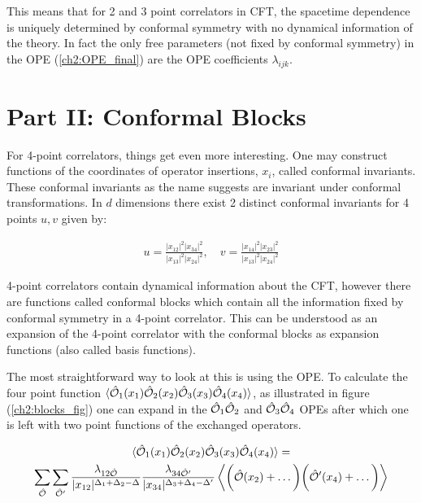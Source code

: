   This means that for 2 and 3 point correlators in CFT, the spacetime dependence is uniquely determined by conformal symmetry with no dynamical information of the theory. In fact the only free parameters (not fixed by conformal symmetry) in the OPE (\ref{ch2:OPE_final}) are the OPE coefficients $\lambda_{ijk}$.
  

  \section{Part II: Conformal Blocks}
  
    For 4-point correlators, things get even more interesting. One may construct functions of the coordinates of operator insertions, $x_i$, called conformal invariants. These conformal invariants as the name suggests are invariant under conformal transformations. In $d$ dimensions there exist 2 distinct conformal invariants for 4 points $u,v$ given by:
  
  \begin{align} \label{ch2:cross_ratios}
   u=\frac{|x_{12}|^2 |x_{34}|^2}{|x_{13}|^2|x_{24}|^2},\quad v=\frac{|x_{14}|^2|x_{23}|^2}{|x_{13}|^2|x_{24}|^2}
  \end{align}

  
  4-point correlators contain dynamical information about the CFT, however there are functions called conformal blocks which contain all the information fixed by conformal symmetry in a 4-point correlator. This can be understood as an expansion of the 4-point correlator with the conformal blocks as expansion functions (also called basis functions).
  
  The most straightforward way to look at this is using the OPE. To calculate the four point function $\braket{ \hat{\mathcal{{O}}}_1(x_1) \hat{\mathcal{{O}}}_2(x_2) \hat{\mathcal{{O}}}_3(x_3) \hat{\mathcal{{O}}}_4(x_4)}$, as illustrated in figure (\ref{ch2:blocks_fig}) one can expand in the $\hat{\mathcal{{O}}}_1 \hat{\mathcal{{O}}}_2$ and $\hat{\mathcal{{O}}}_3 \hat{\mathcal{{O}}}_4$ OPEs after which one is left with two point functions of the exchanged operators.
  
  
  \begin{multline}
   \braket{ \hat{\mathcal{{O}}}_1(x_1) \hat{\mathcal{{O}}}_2(x_2) \hat{\mathcal{{O}}}_3(x_3) \hat{\mathcal{{O}}}_4(x_4)} = \\ \sum_{\hat{\mathcal{{O}}}} \sum_{\hat{\mathcal{{O}}}^\prime} \frac{\lambda_{12\hat{\mathcal{{O}}}}}{|x_{12}|^{\Delta_1+\Delta_2-\Delta}} \frac{\lambda_{34\hat{\mathcal{{O}}}^\prime}}{|x_{34}|^{\Delta_3+\Delta_4-\Delta^\prime}} \Braket{\bigg( \hat{\mathcal{{O}}}(x_2)+\dots \bigg) \bigg( \hat{\mathcal{{O}}}^\prime(x_4)+\dots\bigg)}
  \end{multline}
  
